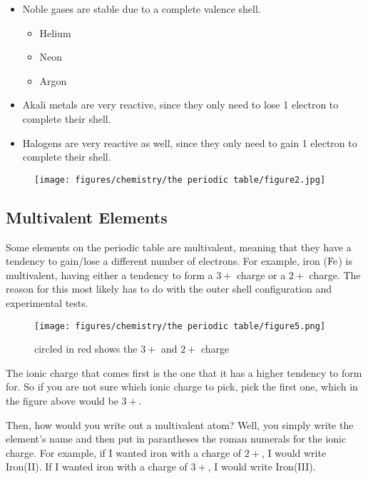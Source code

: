 \documentclass[12pt]{report}
\begin{document}
\begin{itemize}
\setlength\itemsep{0.5em}
    \item{Noble gases are stable due to a complete valence shell.}
    \begin{itemize}
        \item{Helium}
        \item{Neon}
        \item{Argon}
    \end{itemize}
    \item{Akali metals are very reactive, since they only need to lose 1 electron to complete their shell.} 
    \item{Halogens are very reactive as well, since they only need to gain 1 electron to complete their shell.}
\end{itemize}

\begin{figure}[H]
\centering
    \texttt{[image: figures/chemistry/the periodic table/figure2.jpg]}
\end{figure}

\subsection{Multivalent Elements}
Some elements on the periodic table are multivalent, meaning that they have a tendency to gain/lose a different number of electrons. For example, iron ($ \ce{Fe}$) is multivalent, having either a tendency to form a $3+$ charge or a $2+$ charge. The reason for this most likely has to do with the outer shell configuration and experimental tests.\\ 

\begin{figure}[H]
\centering
    \texttt{[image: figures/chemistry/the periodic table/figure5.png]}
    \caption{circled in red shows the $3+$ and $2+$ charge}
\end{figure}

\begin{note}{ }
The ionic charge that comes first is the one that it has a higher tendency to form for. So if you are not sure which ionic charge to pick, pick the first one, which in the figure above would be $3+$. 
\end{note}

Then, how would you write out a multivalent atom? Well, you simply write the element's name and then put in parantheses the roman numerals for the ionic charge. For example, if I wanted iron with a charge of $2+$, I would write Iron(II). If I wanted iron with a charge of $3+$, I would write Iron(III).
\end{document}
